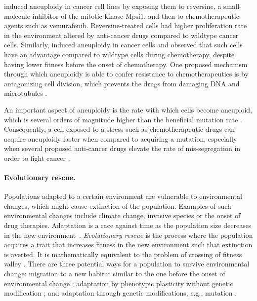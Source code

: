 \documentclass[12pt]{extarticle}
\begin{document}
 \citet{ippolito2021gene} induced aneuploidy in cancer cell lines by exposing them to reversine, a small-molecule inhibitor of the mitotic kinase Mpsi1, and then to chemotherapeutic agents such as vemurafenib. Reversine-treated cells had higher proliferation rate in the environment altered by anti-cancer drugs compared to wildtype cancer cells.
 Similarly, \citet{lukow2021chromosomal} induced aneuploidy in cancer cells and observed that such cells have an advantage compared to wildtype cells during chemotherapy, despite having lower fitness before the onset of chemotherapy.
One proposed mechanism through which aneuploidy is able to confer resistance to chemotherapeutics is by antagonizing cell division, which prevents the drugs from damaging DNA and microtubules \citep{replogle2020aneuploidy}.
 
An important aspect of aneuploidy is the rate with which cells become aneuploid, which is several orders of magnitude higher than the beneficial mutation rate \citep{bakker2023predicting}. Consequently, a cell exposed to a stress such as chemotherapeutic drugs can acquire aneuploidy faster when compared to acquiring a mutation, especially when several proposed anti-cancer drugs elevate the rate of mis-segregation in order to fight cancer \citep{lee2016effects}.

\paragraph{Evolutionary rescue.} Populations adapted to a certain environment are vulnerable to environmental changes, which might cause extinction of the population. Examples of such environmental changes include climate change, invasive species or the onset of drug therapies. Adaptation is a race against time as the population size decreases in the new environment~\citep{tanaka2022surviving}. 
\emph{Evolutionary rescue} is the process where the population acquires a trait that increases fitness in the new environment such that extinction is averted. It is mathematically equivalent to the problem of crossing of fitness valley \citep{weissman2009rate,weissman2010rate}.
There are three potential ways for a population to survive environmental change: migration to a new habitat similar to the one before the onset of environmental change \citep{harsch2014keeping,cobbold2020should,zhou2022range}; adaptation by phenotypic plasticity without genetic modification \citep{carja2019evolutionary,carja2017evolutionary,levien2021non,gunnarsson2020understanding}; and adaptation through genetic modifications, e.g., mutation \citep{gomulkiewicz1995does,uecker2014evolutionary,uecker2016role,uecker2011fixation,orr2014population}.
\end{document}
